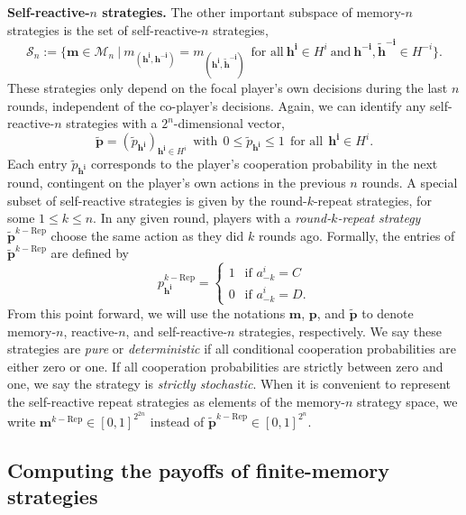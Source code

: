 \documentclass[11pt]{article}
\theoremstyle{plainCl1}
\theoremstyle{plainCl2}
\begin{document}
\noindent
{\bfseries Self-reactive-$n$ strategies.}
The other important subspace of memory-$n$ strategies is the set of self-reactive-$n$ strategies, 
\begin{equation}
\mathcal{S}_n:=\Big\{ \mathbf{m}\!\in\!\mathcal{M}_n ~\Big|~ m_{(\mathbf{h^i},\mathbf{h^{-i}})}\!=\!m_{(\mathbf{h^i},\mathbf{\tilde h^{-i}})}~~\text{for all}~\mathbf{h^i}\!\in\!H^i~\text{and}~\mathbf{h^{-i}},\mathbf{\tilde h^{-i}}\!\in\!H^{-i}\Big\}.
\end{equation}
These strategies only depend on the focal player's own decisions during the last $n$ rounds, independent of the co-player's decisions. 
Again, we can identify any self-reactive-$n$ strategies with a $2^n$-dimensional vector, 
\begin{equation}
\mathbf{\tilde{p}} = (\tilde{p}_\mathbf{h^{i}})_{\mathbf{h^{i}} \in H^i}  ~~\text{with}~~ 0\!\le\!\tilde p_\mathbf{h^i}\!\le\!1 ~~\text{for all}~~ \mathbf{h^i}\!\in\! H^i.
\end{equation}
Each entry $\tilde{p}_{\mathbf{h^{i}}}$ corresponds to the player's cooperation
probability in the next round, contingent on the player's own actions in
the previous $n$ rounds.
A special subset of self-reactive strategies is given by the round-$k$-repeat strategies, for some $1\le
k\le n$. 
In any given round, players with a {\it round-$k$-repeat strategy} $\mathbf{\tilde p}^{k-\text{Rep}}$ choose the same action as they did $k$ rounds ago. 
Formally, the entries of $\mathbf{\tilde p}^{k-\text{Rep}}$ are defined by
$$
p^{k-\text{Rep}}_\mathbf{h^i} =
\left\{
\begin{array}{l}
1~~ \text{ if } a^i_{-k}\!=\!C\\[0.1cm]
0~~ \text{ if } a^i_{-k}\!=\!D.
\end{array}
\right.
$$
From this point forward, we will use the notations $\mathbf{m}$, $\mathbf{p}$,
and $\mathbf{\tilde{p}}$ to denote memory-$n$, reactive-$n$, and
self-reactive-$n$ strategies, respectively. 
We say these strategies are {\it pure} or {\it deterministic} if all conditional cooperation probabilities are either zero or one. 
If all cooperation probabilities are strictly between zero and one, we say the strategy is {\it strictly stochastic}. 
When it is convenient to represent the self-reactive repeat strategies as elements of the memory-$n$ strategy space, we write $\mathbf{m}^{k-\text{Rep}}\!\in\![0,1]^{2^{2n}}$ instead of $\mathbf{\tilde p}^{k-\text{Rep}}\!\in\![0,1]^{2^n}$.


\subsection{Computing the payoffs of finite-memory strategies}
\end{document}
